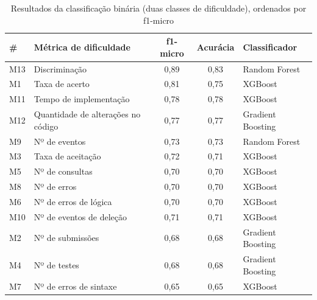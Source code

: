 \documentclass[12pt]{article}
\begin{document}
\begin{table}[h!]
    \centering
    \footnotesize
    \caption{Resultados da classificação binária (duas classes de dificuldade), ordenados por f1-micro}
    \label{tab:tabela_class_binaria}
    \begin{tabular}{@{}llccl@{}}
        \toprule
        \textbf{\#} & \textbf{Métrica de dificuldade} & \textbf{f1-micro} & \textbf{Acurácia} & \textbf{Classificador} \\
        \midrule
        M13 & Discriminação & 0,89 & 0,83 & Random Forest \\
        M1 & Taxa de acerto & 0,81 & 0,75 & XGBoost \\
        M11 & Tempo de implementação & 0,78 & 0,78 & XGBoost \\
        M12 & Quantidade de alterações no código & 0,77 & 0,77 & Gradient Boosting \\
        M9 & Nº de eventos & 0,73 & 0,73 & Random Forest \\
        M3 & Taxa de aceitação & 0,72 & 0,71 & XGBoost \\
        M5 & Nº de consultas & 0,70 & 0,70 & XGBoost \\
        M8 & Nº de erros & 0,70 & 0,70 & XGBoost \\
        M6 & Nº de erros de lógica & 0,70 & 0,70 & XGBoost \\
        M10 & Nº de eventos de deleção & 0,71 & 0,71 & XGBoost \\
        M2 & Nº de submissões & 0,68 & 0,68 & Gradient Boosting \\
        M4 & Nº de testes & 0,68 & 0,68 & Gradient Boosting \\
        M7 & Nº de erros de sintaxe & 0,65 & 0,65 & XGBoost \\
        \bottomrule
    \end{tabular}
\end{table}
\end{document}
